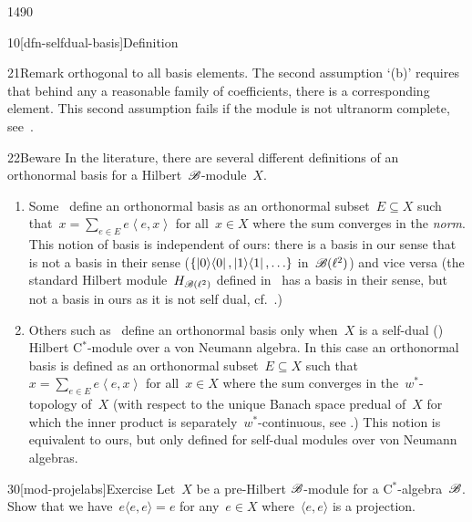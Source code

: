 \begin{parsec}{1490}
\begin{point}{10}[dfn-selfdual-basis]{Definition}
\begin{point}{21}{Remark}
    orthogonal to all basis elements.
The second assumption `(b)' requires that behind
    any a reasonable family of coefficients,
    there is a corresponding element.
This second assumption fails if the module is not ultranorm complete,
    see~.
\end{point}
\begin{point}{22}{Beware}%
In the literature, there are several different definitions of an
    orthonormal basis
    for a Hilbert~$\mathscr{B}$-module~$X$.
\begin{enumerate}
\item
Some~\cite{landi2012orthogonal,manuilov2000hilbertc}
    define an orthonormal basis as an orthonormal subset~$E \subseteq X$
        such that~$x = \sum_{e \in E} e \left<e, x\right>$
    for all~$x \in X$
    where the sum converges in the \emph{norm}.
This notion of basis is independent of ours:
        there is a basis in our sense
         that is not a basis
        in their sense ($\{ \left|0\right>\!\left<0\right|, \left|1\right>\!\left<1\right|, \ldots\}$
        in~$\mathscr{B}(\ell^2)$)
        and vice versa (the standard Hilbert module~$H_{\mathscr{B}(\ell^2)}$
            defined in~\cite[\S3]{landi2012orthogonal} has a basis
            in their sense, but not a basis in ours
            as it is not self dual, cf.~.)
\item
Others such as~\cite[lemma~8.5.23]{blecher2004operator}
    define an orthonormal basis
        only when~$X$ is a self-dual ()
        Hilbert C$^*$-module
            over a von Neumann algebra.
    In this case an orthonormal basis
        is defined
        as an orthonormal subset~$E \subseteq X$
    such that~$x = \sum_{e \in E} e \left<e, x \right>$
        for all~$x \in X$
        where the sum converges in the~$w^*$-topology of~$X$
        (with respect to the unique Banach space predual
    of~$X$ for which the inner product is
    separately~$w^*$-continuous,
        see \cite[lemma 8.5.4]{blecher2004operator}.)
This notion is equivalent to ours, but only defined
    for self-dual modules over von Neumann algebras.
\end{enumerate}
\spacingfix{}
\end{point}
\end{point}
\begin{point}{30}[mod-projelabs]{Exercise}%
Let~$X$ be a pre-Hilbert $\mathscr{B}$-module for a C$^*$-algebra~$\mathscr{B}$.
Show that we have~$ e \langle e,e \rangle = e$
    for any~$e \in X$
   where~$\langle e, e\rangle$ is a projection.


\end{point}
\end{parsec}

